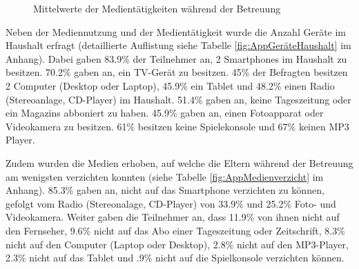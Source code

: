 \begin{figure}%
\caption{Mittelwerte der Medientätigkeiten während der Betreuung}\label{fig:Medientätigkeit}
{}
\end{figure}

Neben der Mediennutzung und der Medientätigkeit wurde die Anzahl Geräte im Haushalt erfragt (detaillierte Auflistung siehe Tabelle \ref{fig:AppGeräteHaushalt} im Anhang). Dabei gaben 83.9\% der Teilnehmer an, 2 Smartphones im Haushalt zu besitzen. 70.2\% gaben an, ein TV-Gerät zu besitzen. 45\% der Befragten besitzen 2 Computer (Desktop oder Laptop), 45.9\% ein Tablet und 48.2\% einen Radio (Stereoanlage, CD-Player) im Haushalt. 51.4\% gaben an, keine Tageszeitung oder ein Magazins abboniert zu haben. 45.9\% gaben an, einen Fotoapparat oder Videokamera zu besitzen. 61\% besitzen keine Spielekonsole und 67\% keinen MP3 Player.

Zudem wurden die Medien erhoben, auf welche die Eltern während der Betreuung am wenigsten verzichten konnten (siehe Tabelle \ref{fig:AppMedienverzicht} im Anhang). 85.3\% gaben an, nicht auf das Smartphone verzichten zu können, gefolgt vom Radio (Stereonalage, CD-Player) von 33.9\% und 25.2\% Foto- und Videokamera. Weiter gaben die Teilnehmer an, dass 11.9\% von ihnen nicht auf den Fernseher, 9.6\% nicht auf das Abo einer Tageszeitung oder Zeitschrift, 8.3\% nicht auf den Computer (Laptop oder Desktop), 2.8\% nicht auf den MP3-Player, 2.3\% nicht auf das Tablet und .9\% nicht auf die Spielkonsole verzichten können.

